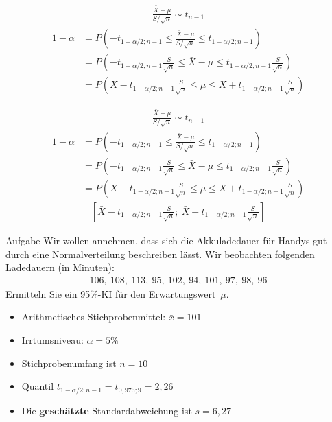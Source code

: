 \documentclass[t,11pt]{beamer}
\begin{document}
\begin{frame}
\begin{align*}
\frac{\bar{X}-\mu}{S/\sqrt{n}}\sim t_{n-1}
\end{align*}
\begin{align*}
1-\alpha &= P(-t_{1-\alpha/2; n-1} \leq \frac{\bar{X}-\mu}{S/\sqrt{n}} \leq t_{1-\alpha/2; n-1} ) \\
&= P(-t_{1-\alpha/2; n-1}  \frac{S}{\sqrt{n}}\leq \bar{X}-\mu \leq t_{1-\alpha/2; n-1} \frac{S}{\sqrt{n}}) \\
&= P(\bar{X} -t_{1-\alpha/2; n-1}  \frac{S}{\sqrt{n}}\leq \mu \leq \bar{X} + t_{1-\alpha/2; n-1}  \frac{S}{\sqrt{n}})
\end{align*}
\end{frame}

\begin{frame}
\begin{align*}
\frac{\bar{X}-\mu}{S/\sqrt{n}}\sim t_{n-1}
\end{align*}
\begin{align*}
1-\alpha &= P(-t_{1-\alpha/2; n-1} \leq \frac{\bar{X}-\mu}{S/\sqrt{n}} \leq t_{1-\alpha/2; n-1} ) \\
&= P(-t_{1-\alpha/2; n-1}  \frac{S}{\sqrt{n}}\leq \bar{X}-\mu \leq t_{1-\alpha/2; n-1} \frac{S}{\sqrt{n}}) \\
&= P(\bar{X} -t_{1-\alpha/2; n-1}  \frac{S}{\sqrt{n}}\leq \mu \leq \bar{X} + t_{1-\alpha/2; n-1}  \frac{S}{\sqrt{n}})
\end{align*}
\begin{align*}
\left[ \bar{X} - t_{1-\alpha/2; n-1} \frac{S}{\sqrt{n}};~\bar{X} + t_{1-\alpha/2; n-1} \frac{S}{\sqrt{n}} \right]
\end{align*}
\end{frame}

\begin{frame}
	\begin{block}{Aufgabe}
		Wir wollen annehmen, dass sich die Akkuladedauer für Handys gut durch eine Normalverteilung beschreiben lässt. Wir beobachten folgenden Ladedauern (in Minuten):
		\begin{align*}
		106,~108,~113,~95,~102,~94,~101,~97,~98,~96 
		\end{align*}
		Ermitteln Sie ein 95\%-KI für den Erwartungswert~$\mu$.
	\end{block}
	\begin{itemize}
		\item Arithmetisches Stichprobenmittel: $\bar{x} = 101$
		\item Irrtumsniveau: $\alpha=5\%$
		\item Stichprobenumfang ist $n=10$
		\item Quantil $t_{1-\alpha/2; n-1} = t_{0,975;9} = 2,26$
		\item Die \textbf{geschätzte} Standardabweichung ist $s=6,27$
	\end{itemize}
\end{frame}
\end{document}
